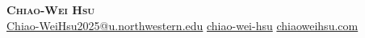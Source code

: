 
\begin{center}
  \textbf{\Huge \scshape Chiao-Wei Hsu} \\ 
  \vspace{5pt plus 2pt minus 2pt} \small \faPhone\hspace{1pt}  
  \hspace{10pt} \faEnvelope\hspace{2pt}\href{mailto:Chiao-WeiHsu2025@u.northwestern.edu} {Chiao-WeiHsu2025@u.northwestern.edu}
  \hspace{10pt} \faLinkedin\hspace{2pt}\href{https://linkedin.com/in/chiao-wei-hsu}{chiao-wei-hsu}
  \hspace{10pt} \faGlobe\hspace{2pt}\href{htts://chiaoweihsu.com}{chiaoweihsu.com}
\end{center}
